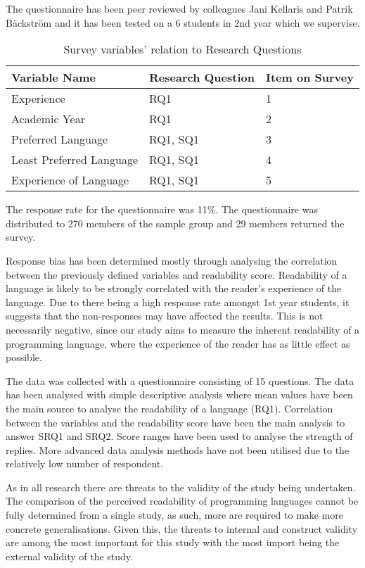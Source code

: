\documentclass[10pt,twocolumn]{article}
\begin{document}
The questionnaire has been peer reviewed by colleagues Jani Kellaris and Patrik Bäckström and it has been tested on a 6 students in 2nd year which we supervise. 

\begin{table}[ht]
  \centering
  \begin{tabularx}
  {\linewidth}{| l | X | X |}
    \hline
    \textbf{Variable Name} & \textbf{Research Question} & \textbf{Item on Survey} \\ \hline
    Experience & RQ1 & 1 \\ \hline
    Academic Year & RQ1 & 2 \\ \hline
    Preferred Language & RQ1, SQ1 & 3 \\ \hline
    Least Preferred Language & RQ1, SQ1 & 4 \\  \hline
    Experience of Language & RQ1, SQ1 & 5 \\ 
    \hline
  \end{tabularx}
  \caption{Survey variables' relation to Research Questions}
\end{table}

The response rate for the questionnaire was 11\%. The questionnaire was distributed to 270 members of the sample group and 29 members returned the survey.

Response bias has been determined mostly through analysing the correlation between the previously defined variables and readability score. Readability of a language is likely to be strongly correlated with the reader's experience of the language. Due to there being a high response rate amongst 1st year students, it suggests that the non-responses may have affected the results. This is not necessarily negative, since our study aims to measure the inherent readability of a programming language, where the experience of the reader has as little effect as possible.

The data was collected with a questionnaire consisting of 15 questions. The data has been analysed with simple descriptive analysis where mean values have been the main source to analyse the readability of a language (RQ1). Correlation between the variables and the readability score have been the main analysis to answer SRQ1 and SRQ2. Score ranges have been used to analyse the strength of replies. More advanced data analysis methods have not been utilised due to the relatively low number of respondent. 

As in all research there are threats to the validity of the study being undertaken. The comparison of the perceived readability of programming languages cannot be fully determined from a single study, as such, more are required to make more concrete generalisations. Given this, the threats to internal and construct validity are among the most important for this study with the most import being the external validity of the study.
\end{document}
